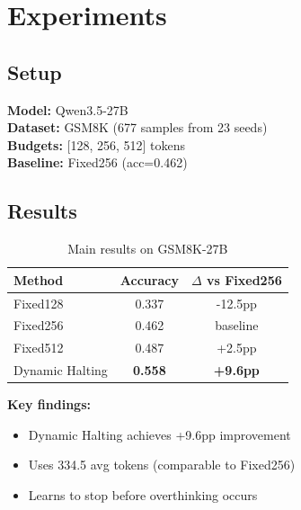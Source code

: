 \section{Experiments}

\subsection{Setup}
\textbf{Model:} Qwen3.5-27B \\
\textbf{Dataset:} GSM8K (677 samples from 23 seeds) \\
\textbf{Budgets:} [128, 256, 512] tokens \\
\textbf{Baseline:} Fixed256 (acc=0.462)

\subsection{Results}

\begin{table}[h]
\centering
\caption{Main results on GSM8K-27B}
\begin{tabular}{lcc}
\toprule
Method & Accuracy & $\Delta$ vs Fixed256 \\
\midrule
Fixed128 & 0.337 & -12.5pp \\
Fixed256 & 0.462 & baseline \\
Fixed512 & 0.487 & +2.5pp \\
\midrule
Dynamic Halting & \textbf{0.558} & \textbf{+9.6pp} \\
\bottomrule
\end{tabular}
\end{table}

\textbf{Key findings:}
\begin{itemize}
\item Dynamic Halting achieves +9.6pp improvement
\item Uses 334.5 avg tokens (comparable to Fixed256)
\item Learns to stop before overthinking occurs
\end{itemize}
